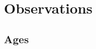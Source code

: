 \documentclass[12pt,preprint]{aastex}
\begin{document}
%

\section{Observations}
\label{sec:data}

\subsection{Ages}
\label{sec:ages}
\end{document}
